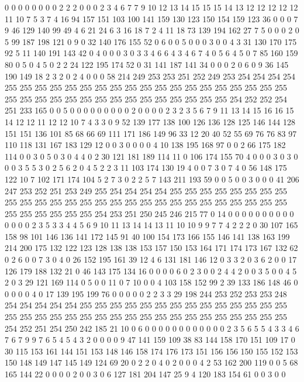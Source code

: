 0 0 0 0 0 0 0 0 2 2 2 0 0 0 2 3 4 6 7 7
9 10 12 13 14 15 15 15 14 13 12 12 12 12 12 11 10 7 5 3
7 4 16 94 157 151 103 100 141 159 130 123 150 154 159 123 36 0 0 0
7 9 46 129 140 99 49 4 6 21 24 6 3 16 18 7 2 4 11 18
73 139 194 162 27 7 5 0 0 0 2 0 5 99 187 198 121 0 9 0
32 140 176 155 52 0 6 0 0 5 0 0 0 3 0 0 4 3 31 130
170 175 92 5 11 140 191 143 42 0 4 0 0 0 3 0 3 3 4 6
6 4 3 4 6 7 4 0 5 6 4 5 0 7 85 160 159 80 0 5
0 4 5 0 2 2 24 122 195 174 52 0 31 141 187 141 34 0 0 0
2 0 6 0 9 36 145 190 149 18 2 3 2 0 2 4 0 0 0 58
214 249 253 253 251 252 249 253 254 254 254 254 255 255 255 255 255 255 255 255
255 255 255 255 255 255 255 255 255 255 255 255 255 255 255 255 255 255 255 255
255 255 255 255 255 255 254 252 252 254 251 233 165 0 0 5 0 0 0 0
0 0 0 0 0 2 0 0 0 0 2 3 2 3 5 6 7 9 11 13
14 15 16 16 15 14 12 12 11 12 12 10 7 4 3 3 0 9 52 139
177 138 100 126 136 128 125 146 144 128 151 151 136 101 85 68 66 69 111 171
186 149 96 33 12 20 40 52 55 69 76 76 83 97 110 118 131 167 183 129
12 0 0 3 0 0 0 0 4 10 138 195 168 97 0 0 2 66 175 182
114 0 0 3 0 5 0 3 0 4 4 0 2 30 121 181 189 114 11 0
106 174 155 70 4 0 0 0 3 0 3 0 0 0 3 5 5 3 0 2
5 6 2 0 4 5 2 2 3 11 103 174 130 19 4 0 0 7 3 0
7 4 0 56 148 175 122 10 7 102 171 174 104 5 2 7 3 0 2 2
5 7 143 211 193 59 0 0 5 0 0 3 0 0 0 41 206 247 253 252
251 253 249 255 254 254 254 254 255 255 255 255 255 255 255 255 255 255 255 255
255 255 255 255 255 255 255 255 255 255 255 255 255 255 255 255 255 255 255 255
255 254 253 251 250 245 246 215 77 0 14 0 0 0 0 0 0 0 0 0
0 0 0 0 0 2 3 5 3 3 4 4 5 6 9 10 11 13 14 14
13 11 10 10 9 9 7 7 4 2 2 2 0 30 107 165 158 98 101 146
136 141 172 145 91 40 100 154 173 166 155 146 141 138 163 199 214 200 175 132
122 123 128 138 138 153 157 150 153 164 171 174 173 167 132 62 0 2 6 0
0 7 3 0 4 0 26 152 195 161 39 12 4 6 131 181 146 12 0 3
3 2 0 3 6 2 0 0 17 126 179 188 132 21 0 46 143 175 134 16
0 0 0 0 6 0 2 3 0 0 2 4 4 2 0 0 3 5 0 0
4 5 2 0 3 29 121 169 114 0 5 0 0 11 0 7 10 0 0 4
103 158 152 99 2 39 133 186 148 46 0 0 0 0 0 4 0 17 139 195
199 76 0 0 0 0 0 2 2 3 3 29 198 244 253 252 253 253 248 254
254 254 254 254 255 255 255 255 255 255 255 255 255 255 255 255 255 255 255 255
255 255 255 255 255 255 255 255 255 255 255 255 255 255 255 255 255 254 252 251
254 250 242 185 21 10 0 6 0 0 0 0 0 0 0 0 0 0 0 0
2 3 5 6 5 5 4 3 3 4 6 7 6 7 9 9 7 6 5 4
5 4 3 2 0 0 0 0 9 47 141 159 109 38 83 144 158 170 151 109
17 0 30 115 153 161 144 151 153 148 146 158 174 176 173 151 156 156 150 155
152 153 150 148 149 147 145 149 124 69 20 0 2 2 0 4 0 2 0 0
0 4 2 53 162 200 119 0 0 5 68 165 144 22 0 0 0 0 2 0
0 3 0 6 127 181 204 147 25 9 4 120 183 154 61 0 0 3 0 0
